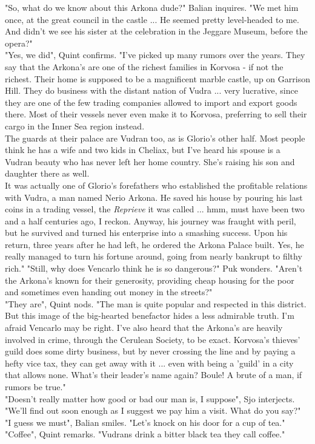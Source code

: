 "So, what do we know about this Arkona dude?" Balian inquires. "We met him once, at the great council in the castle ...  He seemed pretty level-headed to me. And didn't we see his sister at the celebration in the Jeggare Museum, before the opera?"\\

"Yes, we did", Quint confirms. "I've picked up many rumors over the years. They say that the Arkona's are one of the richest families in Korvosa - if not the richest. Their home is supposed to be a magnificent marble castle, up on Garrison Hill. They do business with the distant nation of Vudra ... very lucrative, since they are one of the few trading companies allowed to import and export goods there. Most of their vessels never even make it to Korvosa, preferring to sell their cargo in the Inner Sea region instead.\\

The guards at their palace are Vudran too, as is Glorio's other half. Most people think he has a wife and two kids in Cheliax, but I've heard his spouse is a Vudran beauty who has never left her home country. She's raising his son and daughter there as well.\\

It was actually one of Glorio's forefathers who established the profitable relations with Vudra, a man named Nerio Arkona. He saved his house by pouring his last coins in a trading vessel, the {\itshape Reprieve} it was called ... hmm, must have been two and a half centuries ago, I reckon. Anyway, his journey was fraught with peril, but he survived and turned his enterprise into a smashing success. Upon his return, three years after he had left, he ordered the Arkona Palace built. Yes, he really managed to turn his fortune around, going from nearly bankrupt to filthy rich." "Still, why does Vencarlo think he is so dangerous?" Puk wonders. "Aren't the Arkona's known for their generosity, providing cheap housing for the poor and sometimes even handing out money in the streets?"\\

"They are", Quint nods. "The man is quite popular and respected in this district. But this image of the big-hearted benefactor hides a less admirable truth. I'm afraid Vencarlo may be right. I've also heard that the Arkona's are heavily involved in crime, through the Cerulean Society, to be exact. Korvosa's thieves' guild does some dirty business, but by never crossing the line and by paying a hefty vice tax, they can get away with it ... even with being a 'guild' in a city that allows none. What's their leader's name again? Boule! A brute of a man, if rumors be true."\\

"Doesn't really matter how good or bad our man is, I suppose", Sjo interjects. "We'll find out soon enough as I suggest we pay him a visit. What do you say?"\\

"I guess we must", Balian smiles. "Let's knock on his door for a cup of tea."\\

"Coffee", Quint remarks. "Vudrans drink a bitter black tea they call coffee."\\

